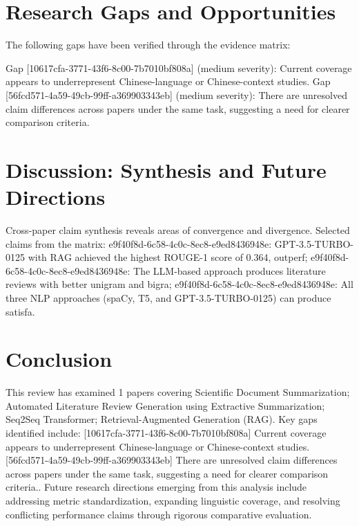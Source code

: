 \documentclass{article}
\begin{document}
\section{Research Gaps and Opportunities}
The following gaps have been verified through the evidence matrix:

Gap [10617cfa-3771-43f6-8c00-7b7010bf808a] (medium severity): Current coverage appears to underrepresent Chinese-language or Chinese-context studies.
Gap [56fcd571-4a59-49cb-99ff-a369903343eb] (medium severity): There are unresolved claim differences across papers under the same task, suggesting a need for clearer comparison criteria.

\section{Discussion: Synthesis and Future Directions}
Cross-paper claim synthesis reveals areas of convergence and divergence. Selected claims from the matrix: e9f40f8d-6c58-4c0c-8ec8-e9ed8436948e: GPT-3.5-TURBO-0125 with RAG achieved the highest ROUGE-1 score of 0.364, outperf; e9f40f8d-6c58-4c0c-8ec8-e9ed8436948e: The LLM-based approach produces literature reviews with better unigram and bigra; e9f40f8d-6c58-4c0c-8ec8-e9ed8436948e: All three NLP approaches (spaCy, T5, and GPT-3.5-TURBO-0125) can produce satisfa.

\section{Conclusion}
This review has examined 1 papers covering Scientific Document Summarization; Automated Literature Review Generation using Extractive Summarization; Seq2Seq Transformer; Retrieval-Augmented Generation (RAG). Key gaps identified include: [10617cfa-3771-43f6-8c00-7b7010bf808a] Current coverage appears to underrepresent Chinese-language or Chinese-context studies. [56fcd571-4a59-49cb-99ff-a369903343eb] There are unresolved claim differences across papers under the same task, suggesting a need for clearer comparison criteria.. Future research directions emerging from this analysis include addressing metric standardization, expanding linguistic coverage, and resolving conflicting performance claims through rigorous comparative evaluation.
\end{document}
